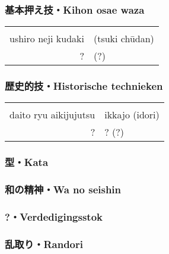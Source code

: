 \subsubsection{基本押え技・Kihon osae waza}
\begin{table}[H]
\begin{center}
\begin{tabular}{rl}
    \ruby{}{}\ruby{}{} & \\
    ushiro neji kudaki & (tsuki ch\={u}dan)\\
    ? & (?)
\end{tabular}
\end{center}
\label{kyuu_2_kihon_osae_waza}
\end{table}

\subsubsection{歴史的技・Historische technieken}
\begin{table}[H]
\begin{center}
\begin{tabular}{rl}
    \ruby{}{}\ruby{}{} & \\
    daito ryu aikijujutsu & ikkajo (idori)\\
    ? & ? (?)
\end{tabular}
\end{center}
\label{kyuu_2_historic}
\end{table}

\subsubsection{型・Kata}
\subsubsection{和の精神・Wa no seishin}
\subsubsection{?・Verdedigingsstok}
\subsubsection{乱取り・Randori}
